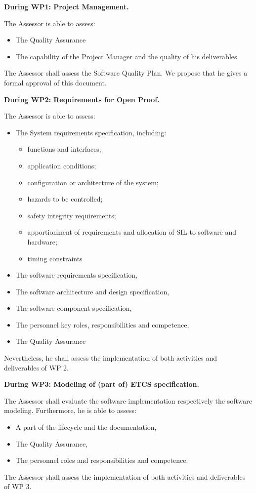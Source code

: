 \documentclass{template/openetcs_report}
\begin{document}
\textbf{
During WP1: Project Management.
}

The Assessor is able to assess:
\begin{itemize}\itemsep=0pt
  \item The Quality Assurance
  \item The capability of the Project Manager and the quality of his deliverables
 \end{itemize}

The Assessor shall assess the Software Quality Plan. We propose that he gives a formal approval of this document.


\textbf{
During WP2: Requirements for Open Proof.
}


The Assessor is able to assess:
\begin{itemize}\itemsep=0pt
  \item The System requirements specification, including:
  \begin{itemize}\itemsep=3pt
    \item functions and interfaces;
    \item application conditions;
    \item configuration or architecture of the system;
    \item hazards to be controlled;
    \item safety integrity requirements;
    \item apportionment of requirements and allocation of SIL to software and hardware;
    \item timing constraints
   \end{itemize}
  \item The software requirements specification,
  \item The software architecture and design specification,
  \item The software component specification,
  \item The personnel key roles, responsibilities and competence,
  \item The Quality Assurance
 \end{itemize}
Nevertheless, he shall assess the implementation of both activities and deliverables of WP 2.


\textbf{
During WP3: Modeling of (part of) ETCS specification.
}

The Assessor shall evaluate the software implementation respectively the software modeling.
Furthermore, he is able to assess:
\begin{itemize}\itemsep=0pt
  \item A part of the lifecycle and the documentation,
  \item The Quality Assurance,
  \item The personnel roles and responsibilities and competence.
 \end{itemize}
The Assessor shall assess the implementation of both activities and deliverables of WP 3.
\end{document}
